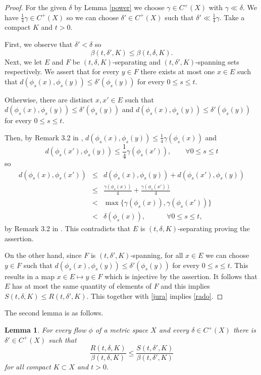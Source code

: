 \documentclass[11pt,letterpaper]{amsart}
\newtheorem{lemma}[thm]{Lemma}
\begin{document}
\begin{proof}
For the given $\delta$ by Lemma \ref{power} we choose $\gamma\in C^+(X)$ with $\gamma \ll\delta$. We have $\frac{1}4\gamma\in C^+(X)$ so we can choose
$\delta'\in C^+(X)$ such that $\delta' \ll\frac{1}4\gamma$.
Take a compact $K$ and $t>0$.

First, we observe that $\delta'<\delta$ so
\begin{equation}
\label{jura}
\beta(t,\delta',K)\leq \beta(t,\delta,K).
\end{equation}
Next, we let $E$ and $F$ be $(t,\delta,K)$-separating and $(t,\delta',K)$-spanning sets respectively.
We assert that for every $y\in F$ there exists at most one $x\in E$ such that
$d(\phi_s(x),\phi_s(y))\leq \delta'(\phi_s(y))$ for every $0\leq s\leq t$.


Otherwise, there are distinct $x,x'\in E$ such that
$d(\phi_s(x),\phi_s(y))\leq \delta'(\phi_s(y))$
and $d(\phi_s(x),\phi_s(y))\leq \delta'(\phi_s(y))$ for every $0\leq s\leq t$.

Then, by Remark 3.2 in \cite{lny},
$d(\phi_s(x),\phi_s(y))\leq \frac{1}4\gamma(\phi_s(x))$
and
$$
d(\phi_s(x'),\phi_s(y))\leq \frac{1}4\gamma(\phi_s(x')),\qquad\forall 0\leq s\leq t
$$
so
\begin{eqnarray*}
d(\phi_s(x),\phi_s(x'))&\leq& d(\phi_s(x),\phi_s(y))+d(\phi_s(x'),\phi_s(y))\\
&\leq& \frac{\gamma(\phi_s(x))}4+\frac{\gamma(\phi_s(x'))}4\\
&<&\max\{\gamma(\phi_s(x)),\gamma(\phi_s(x'))\}\\
&<& \delta(\phi_s(x)),\quad\quad\quad \forall 0\leq s\leq t,
\end{eqnarray*}
by Remark 3.2 in \cite{lny}. This contradicts that $E$ is $(t,\delta,K)$-separating proving the assertion.


On the other hand, since $F$ is $(t,\delta',K)$-spanning,
for all $x\in E$ we can choose $y\in F$ such that
$d(\phi_s(x),\phi_s(y))\leq \delta'(\phi_s(y))$ for every $0\leq s\leq t$.
This results in a map $x\in E\mapsto y\in F$ which is injective by the assertion. It follows that $E$ has at most the same quantity of elements of $F$ and this implies
$S(t,\delta,K)\leq R(t,\delta',K)$. This together with \eqref{jura} implies \eqref{rado}.
\end{proof}


The second lemma is as follows.


\begin{lemma}
\label{le1}
For every flow $\phi$ of a metric space $X$ and every
$\delta\in C^+(X)$ there is $\delta'\in C^+(X)$ such that
\begin{equation}
\label{silve}
\frac{R(t,\delta,K)}{\beta(t,\delta,K)}\leq \frac{S(t,\delta',K)}{\beta(t,\delta',K)}
\end{equation}
for all compact $K\subset X$ and $t>0$.
\end{lemma}
\end{document}
